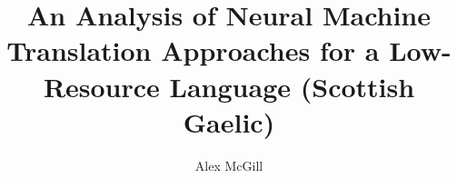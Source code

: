\title{An Analysis of Neural Machine Translation Approaches for a Low-Resource Language (Scottish Gaelic)}
\author{Alex McGill}








